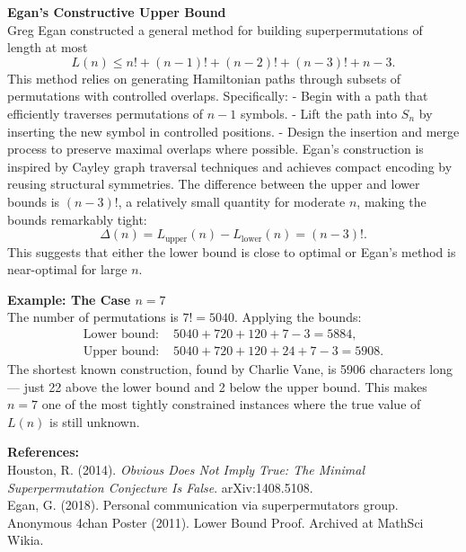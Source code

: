 \begin{technical}
\noindent\textbf{Egan's Constructive Upper Bound}\\
Greg Egan constructed a general method for building superpermutations of length at most
\[
L(n) \leq n! + (n-1)! + (n-2)! + (n-3)! + n - 3.
\]
This method relies on generating Hamiltonian paths through subsets of permutations with controlled overlaps. Specifically:
- Begin with a path that efficiently traverses permutations of $n-1$ symbols.
- Lift the path into $S_n$ by inserting the new symbol in controlled positions.
- Design the insertion and merge process to preserve maximal overlaps where possible.
Egan's construction is inspired by Cayley graph traversal techniques and achieves compact encoding by reusing structural symmetries. The difference between the upper and lower bounds is $(n-3)!$, a relatively small quantity for moderate $n$, making the bounds remarkably tight:
\[
\Delta(n) = L_{\text{upper}}(n) - L_{\text{lower}}(n) = (n-3)!.
\]
This suggests that either the lower bound is close to optimal or Egan's method is near-optimal for large $n$.

\noindent\textbf{Example: The Case $n = 7$}\\
The number of permutations is $7! = 5040$. Applying the bounds:
\begin{align}
\text{Lower bound: } & 5040 + 720 + 120 + 7 - 3 = 5884, \\
\text{Upper bound: } & 5040 + 720 + 120 + 24 + 7 - 3 = 5908.
\end{align}
The shortest known construction, found by Charlie Vane, is 5906 characters long — just 22 above the lower bound and 2 below the upper bound. This makes $n = 7$ one of the most tightly constrained instances where the true value of $L(n)$ is still unknown.

\noindent\textbf{References:}\\
Houston, R. (2014). \textit{Obvious Does Not Imply True: The Minimal Superpermutation Conjecture Is False}. arXiv:1408.5108.\\
Egan, G. (2018). Personal communication via superpermutators group.\\
Anonymous 4chan Poster (2011). Lower Bound Proof. Archived at MathSci Wikia.
\end{technical}
